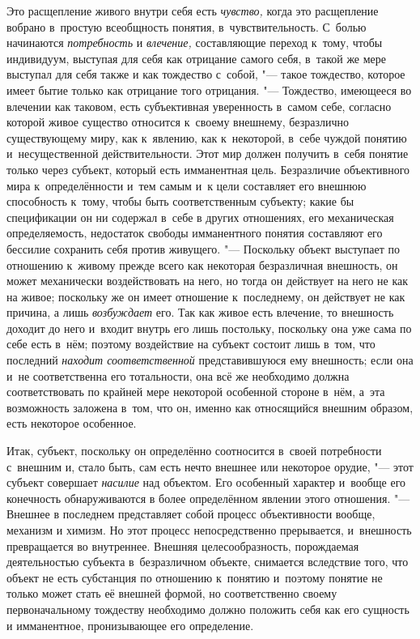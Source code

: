 Это расщепление живого внутри себя есть
{\em чувство,} когда это
расщепление вобрано в~простую всеобщность понятия, в~чувствительность.
С~болью начинаются {\em потребность}
и {\em влечение,}
составляющие переход к~тому, чтобы индивидуум, выступая для
себя как отрицание самого себя, в~такой же мере выступал для себя также и
как тождество с~собой, "--- такое тождество, которое имеет
бытие только как отрицание того отрицания. "--- Тождество,
имеющееся во влечении как таковом, есть субъективная уверенность в~самом
себе, согласно которой живое существо относится к~своему внешнему,
безразлично существующему миру, как к~явлению, как к~некоторой, в~себе
чуждой понятию и~несущественной действительности. Этот мир
должен получить в~себя понятие только через субъект, который
есть имманентная цель. Безразличие объективного мира к~определённости и~тем
самым и~к цели составляет его внешнюю способность к~тому, чтобы быть
соответственным субъекту; какие бы спецификации он ни содержал в~себе в
других отношениях, его механическая определяемость, недостаток свободы
имманентного понятия составляют его бессилие сохранить себя против
живущего. "--- Поскольку объект выступает по отношению к~живому
прежде всего как некоторая безразличная внешность, он может механически
воздействовать на него, но тогда он действует на него не как на живое;
поскольку же он имеет отношение к~последнему, он действует не как причина,
а лишь {\em возбуждает}
его. Так как живое есть влечение, то внешность доходит до
него и~входит внутрь его лишь постольку, поскольку она уже сама по себе
есть в~нём; поэтому воздействие на субъект состоит лишь в~том, что
последний {\em находит соответственной}
представившуюся ему внешность; если она и~не соответственна
его тотальности, она всё же необходимо должна соответствовать по крайней
мере некоторой особенной стороне в~нём, а~эта возможность заложена в~том,
что он, именно как относящийся внешним образом, есть некоторое особенное.

Итак, субъект, поскольку он определённо соотносится в~своей
потребности с~внешним и, стало быть, сам есть нечто внешнее или некоторое
орудие, "--- этот субъект совершает
{\em насилие} над
объектом. Его особенный характер и~вообще его конечность обнаруживаются в
более определённом явлении этого отношения. "--- Внешнее в
последнем представляет собой процесс объективности вообще, механизм и
химизм. Но этот процесс непосредственно прерывается, и~внешность
превращается во внутреннее. Внешняя целесообразность, порождаемая
деятельностью субъекта в~безразличном объекте, снимается вследствие того,
что объект не есть субстанция по отношению к~понятию и~поэтому понятие не
только может стать её внешней формой, но соответственно своему
первоначальному тождеству необходимо должно положить себя как его сущность
и имманентное, пронизывающее его определение.

